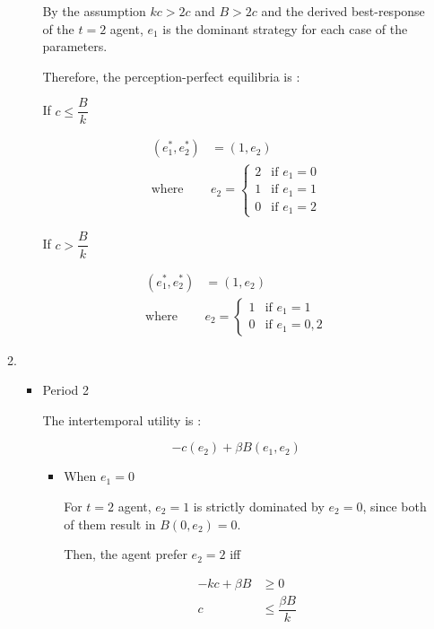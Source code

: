 \documentclass{jsarticle}
\begin{document}
\begin{enumerate}
\begin{enumerate}
\begin{itemize}
By the assumption $kc > 2c$ and $B>2c$ and the derived best-response of the $t=2$ agent, $e_1$ is the dominant strategy for each case of the parameters.

\newpage

Therefore, the perception-perfect equilibria is :

If $c \leq \dfrac{B}{k}$

\begin{align*}
(e_1^*, e_2^*) & = (1,e_2) \\
\text{where } & e_2=\begin{cases}
2 & \text{if } e_1=0 \\
1 & \text{if } e_1=1 \\
0 & \text{if } e_1=2
\end{cases}
\end{align*}

If $c > \dfrac{B}{k}$

\begin{align*}
(e_1^*, e_2^*) & = (1,e_2) \\
\text{where } & e_2=\begin{cases}
1 & \text{if } e_1=1 \\
0 & \text{if } e_1=0, 2
\end{cases}
\end{align*}

\end{itemize}

\dotfill

\item 

\begin{itemize}

\item Period 2

The intertemporal utility is :

\[ -c(e_2) + \beta B(e_1,e_2) \]

\begin{itemize}

\item When $e_1=0$

For $t=2$ agent, $e_2=1$ is strictly dominated by $e_2=0$, since both of them result in $B(0, e_2)=0$.

Then, the agent prefer $e_2=2$ iff

\begin{align*}
- kc + \beta B & \geq 0 \\
c & \leq \dfrac{\beta B}{k}
\end{align*}


\end{itemize}
\end{itemize}
\end{enumerate}
\end{enumerate}
\end{document}
